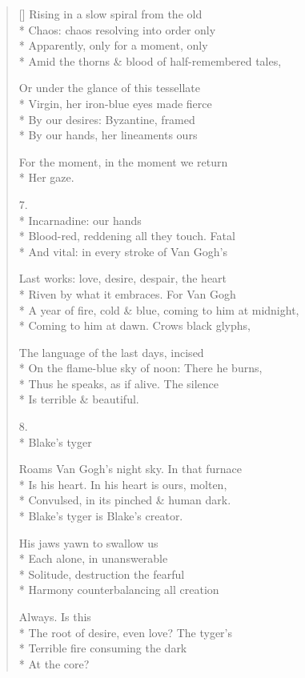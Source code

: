\begin{verse}[\versewidth]
Rising in a slow spiral from the old\\*
Chaos: chaos resolving into order only\\*
Apparently, only for a moment, only\\*
Amid the thorns \& blood of half-remembered tales,

Or under the glance of this tessellate\\*
Virgin, her iron-blue eyes made fierce\\*
By our desires: Byzantine, framed\\*
By our hands, her lineaments ours

For the moment, in the moment we return\\*
Her gaze.

7.\\*
\qquad  Incarnadine: our hands\\*
Blood-red, reddening all they touch. Fatal\\*
And vital: in every stroke of Van Gogh's 

Last works: love, desire, despair, the heart\\*
Riven by what it embraces. For Van Gogh\\*
A year of fire, cold \& blue, coming to him at midnight,\\*
Coming to him at dawn. Crows black glyphs,

The language of the last days, incised\\*
On the flame-blue sky of noon: There he burns,\\*
Thus he speaks, as if alive. The silence\\*
Is terrible \& beautiful.

8.\\*
\hspace{4\vgap} Blake's tyger

Roams Van Gogh's night sky. In that furnace\\*
Is his heart. In his heart is ours, molten,\\*
Convulsed, in its pinched \& human dark.\\*
Blake's tyger is Blake's creator.

His jaws yawn to swallow us\\*
Each alone, in unanswerable\\*
Solitude, destruction the fearful\\*
Harmony counterbalancing all creation

Always.      Is this\\*
The root of desire, even love?  The tyger's\\*
Terrible fire consuming the dark\\*
At the core?


\end{verse}
